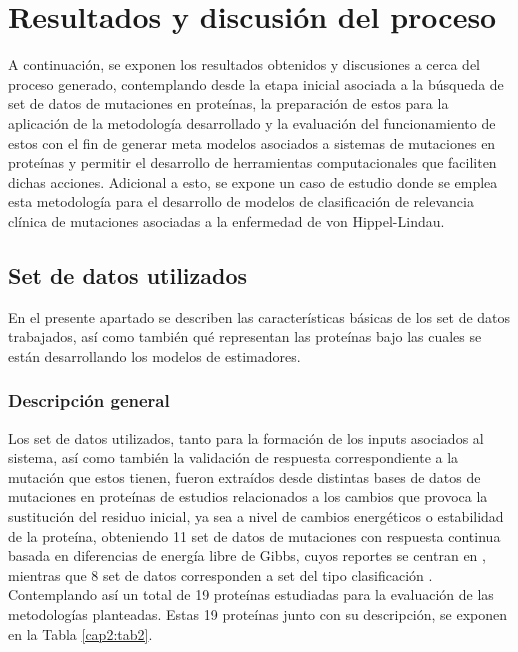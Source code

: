 \section{Resultados y discusión del proceso}

A continuación, se exponen los resultados obtenidos y discusiones a cerca del proceso generado, contemplando desde la etapa inicial asociada a la búsqueda de set de datos de mutaciones en proteínas, la preparación de estos para la aplicación de la metodología desarrollado y la evaluación del funcionamiento de estos con el fin de generar meta modelos asociados a sistemas de mutaciones en proteínas y permitir el desarrollo de herramientas computacionales que faciliten dichas acciones. Adicional a esto, se expone un caso de estudio donde se emplea esta metodología para el desarrollo de modelos de clasificación de relevancia clínica de mutaciones asociadas a la enfermedad de von Hippel-Lindau.

\subsection{Set de datos utilizados}

En el presente apartado se describen las características básicas de los set de datos trabajados, así como también qué representan las proteínas bajo las cuales se están desarrollando los modelos de estimadores.

\subsubsection{Descripción general}

Los set de datos utilizados, tanto para la formación de los inputs asociados al sistema, así como también la validación de respuesta correspondiente a la mutación que estos tienen, fueron extraídos desde distintas bases de datos de mutaciones en proteínas de estudios relacionados a los cambios que provoca la sustitución del residuo inicial, ya sea a nivel de cambios energéticos o estabilidad de la proteína, obteniendo 11 set de datos de mutaciones con respuesta continua basada en diferencias de energía libre de Gibbs, cuyos reportes se centran en \cite{Wainreb2011, Sun2017, petukh2016saambe, Alexov2012,prot20185}, mientras que 8 set de datos corresponden a set del tipo clasificación \cite{ancien2018prediction, broom2017computational, capriotti2008three, quan2016strum, Capriotti2005, 1gzp030, Khan2010, masso2008accurate, getov2016saafec}. Contemplando así un total de 19 proteínas estudiadas para la evaluación de las metodologías planteadas. Estas 19 proteínas junto con su descripción, se exponen en la Tabla \ref{cap2:tab2}.

